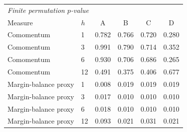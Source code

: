 \begingroup\small\setlength{\tabcolsep}{2.5pt}
\begin{tabular}{llcccc}
\toprule
\multicolumn{6}{l}{\textit{Finite permutation $p$-value}} \\
Measure & $h$ & A & B & C & D \\
\midrule
Comomentum & 1 & 0.782 & 0.766 & 0.720 & 0.280 \\
Comomentum & 3 & 0.991 & 0.790 & 0.714 & 0.352 \\
Comomentum & 6 & 0.930 & 0.706 & 0.686 & 0.265 \\
Comomentum & 12 & 0.491 & 0.375 & 0.406 & 0.677 \\
Margin-balance proxy & 1 & 0.008 & 0.019 & 0.019 & 0.019 \\
Margin-balance proxy & 3 & 0.017 & 0.010 & 0.010 & 0.010 \\
Margin-balance proxy & 6 & 0.018 & 0.010 & 0.010 & 0.010 \\
Margin-balance proxy & 12 & 0.093 & 0.021 & 0.031 & 0.021 \\
\bottomrule
\end{tabular}

\endgroup